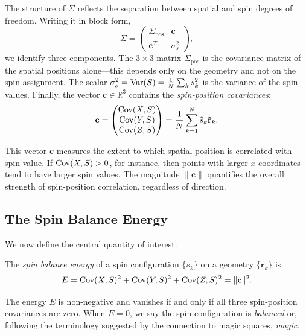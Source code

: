 The structure of $\Sigma$ reflects the separation between spatial and spin degrees of freedom. Writing it in block form,
\begin{equation}
\label{eq:block_structure}
\Sigma = \begin{pmatrix}
\Sigma_{\text{pos}} & \mathbf{c} \\
\mathbf{c}^T & \sigma_s^2
\end{pmatrix},
\end{equation}
we identify three components. The $3 \times 3$ matrix $\Sigma_{\text{pos}}$ is the covariance matrix of the spatial positions alone---this depends only on the geometry and not on the spin assignment. The scalar $\sigma_s^2 = \operatorname{Var}(S) = \frac{1}{N}\sum_k \tilde{s}_k^2$ is the variance of the spin values. Finally, the vector $\mathbf{c} \in \mathbb{R}^3$ contains the \emph{spin-position covariances}:
\begin{equation}
\mathbf{c} = \begin{pmatrix}
\operatorname{Cov}(X, S) \\
\operatorname{Cov}(Y, S) \\
\operatorname{Cov}(Z, S)
\end{pmatrix}
= \frac{1}{N} \sum_{k=1}^N \tilde{s}_k \tilde{\mathbf{r}}_k.
\end{equation}

This vector $\mathbf{c}$ measures the extent to which spatial position is correlated with spin value. If $\operatorname{Cov}(X, S) > 0$, for instance, then points with larger $x$-coordinates tend to have larger spin values. The magnitude $\|\mathbf{c}\|$ quantifies the overall strength of spin-position correlation, regardless of direction.

\subsection{The Spin Balance Energy}
\label{sec:energy}

We now define the central quantity of interest.

\begin{definition}
The \emph{spin balance energy} of a spin configuration $\{s_k\}$ on a geometry $\{\mathbf{r}_k\}$ is
\begin{equation}
E = \operatorname{Cov}(X, S)^2 + \operatorname{Cov}(Y, S)^2 + \operatorname{Cov}(Z, S)^2 = \|\mathbf{c}\|^2.
\end{equation}
\end{definition}

The energy $E$ is non-negative and vanishes if and only if all three spin-position covariances are zero. When $E = 0$, we say the spin configuration is \emph{balanced} or, following the terminology suggested by the connection to magic squares, \emph{magic}.

